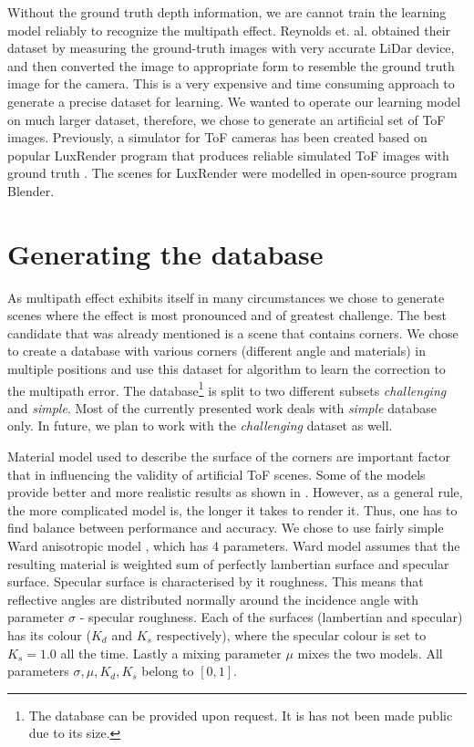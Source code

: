 \documentclass[11pt,twocolumn]{article}
\begin{document}
Without the ground truth depth information, we are cannot train the learning model reliably to recognize the multipath effect. Reynolds et. al. \cite{Reynolds2011} obtained their dataset by measuring the ground-truth images with very accurate LiDar device, and then converted the image to appropriate form to resemble the ground truth image for the camera. This is a very expensive and time consuming approach to generate a precise dataset for learning. We wanted to operate our learning model on much larger dataset, therefore, we chose to generate an artificial set of ToF images. Previously, a simulator for ToF cameras has been created based on popular LuxRender program that produces reliable simulated ToF images with ground truth \cite{Meister2013}. The scenes for LuxRender were modelled in open-source program Blender.

\section{Generating the database}
As multipath effect exhibits itself in many circumstances we chose to generate scenes where the effect is most pronounced and of greatest challenge. The best candidate that was already mentioned is a scene that contains corners. We chose to create a database with various corners (different angle and materials) in multiple positions and use this dataset for algorithm to learn the correction to the multipath error. The database\footnote{The database can be provided upon request. It is has not been made public due to its size.} is split to two different subsets \textit{challenging} and \textit{simple}. Most of the currently presented work deals with \textit{simple} database only. In future, we plan to work with the \textit{challenging} dataset as well.

Material model used to describe the surface of the corners are important factor that in influencing the validity of artificial ToF scenes. Some of the models provide better and more realistic results as shown in \cite{Kondermann2008}. However, as a general rule, the more complicated model is, the longer it takes to render it. Thus, one has to find balance between performance and accuracy. We chose to use fairly simple Ward anisotropic model \cite{Geisler-Moroder2010,Ward1992}, which has 4 parameters. Ward model assumes that the resulting material is weighted sum of perfectly lambertian surface and specular surface. Specular surface is characterised by it roughness. This means that reflective angles are distributed normally around the incidence angle with parameter $\sigma$ - specular roughness. Each of the surfaces (lambertian and specular) has its colour ($K_d$ and $K_s$ respectively), where the specular colour is set to $K_s=1.0$ all the time. Lastly a mixing parameter $\mu$ mixes the two models. All parameters $\sigma, \mu, K_d, K_s$ belong to $[0,1]$.
\end{document}
